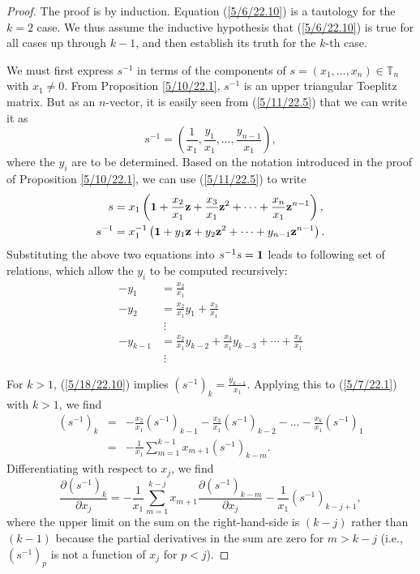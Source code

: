 \documentclass{amsart}
\theoremstyle{definition}
\numberwithin{theorem}{section}
\numberwithin{equation}{section}
\begin{document}
\begin{proof} The proof is by induction. Equation (\ref{5/6/22.10}) is a tautology for the $k=2$ case.  We thus assume the inductive hypothesis that (\ref{5/6/22.10}) is true  for all cases up through $k-1$, and then establish its truth for the $k$-th case.


We must first express $s^{-1}$ in terms of the components of  $s=(x_1,\dots,x_n)\in \mathbb{T}_n$ with $x_1\ne 0$.   From Proposition \ref{5/10/22.1},  $s^{-1}$ is an upper triangular Toeplitz matrix.  But as an $n$-vector, it is easily seen from (\ref{5/11/22.5}) that we can write it as  \begin{equation}\label{5/9/22.1} s^{-1} = (\frac{1}{x_1}, \frac{y_1}{x_1},\dots, \frac{y_{n-1}}{x_1}),\end{equation} where the $y_i$ are to be determined. 
Based on the notation introduced in the proof of Proposition \ref{5/10/22.1}, we can use (\ref{5/11/22.5}) to write 
\begin{align}\nonumber s &= x_1 \left({\bf 1} + \frac{x_2}{x_1} {\bf z} + \frac{x_3}{x_1} {\bf z}^2 + \cdots + \frac{x_n}{x_1} {\bf z}^{n-1}\right), \\ s^{-1} &= x_1^{-1} \left({\bf 1} + y_1 {\bf z} + y_2 {\bf z}^2 + \cdots + y_{n-1} {\bf z}^{n-1}\right).  \label{5/18/22.10} \end{align} \enlargethispage{2cm} Substituting the above two equations into $s^{-1} s = {\bf 1}$ leads to following set of relations, which allow the $y_i$ to be computed recursively:
\begin{align} -y_1 &= \frac{x_2}{x_1} \nonumber \\ -y_2 &= \frac{x_2}{x_1}y_1 + \frac{x_3}{x_1} \nonumber \\ &\;\vdots \nonumber \\ -y_{k-1} &= \frac{x_2}{x_1} y_{k-2} + \frac{x_3}{x_1} y_{k-3} + \cdots + \frac{x_k}{x_1} \label{5/7/22.1} \\ &\;\vdots \nonumber \end{align} 
 
 \noindent For $k>1$, (\ref{5/18/22.10}) implies  $\left( s^{-1} \right)_k = \frac{y_{k-1}}{x_1}$.  Applying this to (\ref{5/7/22.1}) with $k>1$, we find
\begin{eqnarray} \nonumber \left( s^{-1} \right)_k &=& -\frac{x_2}{x_1}\left( s^{-1} \right)_{k-1} - \frac{x_3}{x_1}\left( s^{-1} \right)_{k-2} -\dots  - \frac{x_k}{x_1}\left( s^{-1} \right)_1 \\ &=& -\frac{1}{x_1}\sum_{m=1}^{k-1} x_{m+1}\left( s^{-1} \right)_{k-m}. \label{5/7/22.2}\end{eqnarray}
Differentiating with respect to $x_j$, we find \begin{equation}  \frac{\partial \left( s^{-1} \right)_k}{\partial x_j} = -\frac{1}{x_1} \sum_{m=1}^{k-j} x_{m+1} \frac{\partial \left( s^{-1} \right)_{k-m}}{\partial x_j} -  \frac{1}{x_1}\left( s^{-1} \right)_{k-j+1} \label{5/7/22.4}, \end{equation} where the upper limit on the sum on the right-hand-side is $(k-j)$ rather than $(k-1)$ because the partial derivatives in the sum are zero for $m> k-j$ (i.e., $\left( s^{-1} \right)_p$ is not a function of $x_j$ for $p<j$).  


\end{proof}
\end{document}
